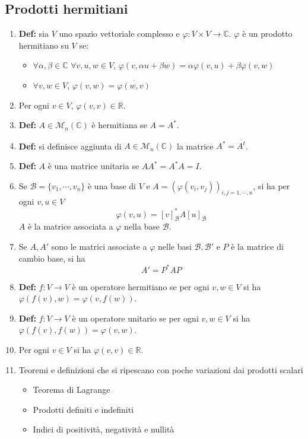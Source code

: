 \documentclass[a4paper,11pt]{article}
\newcommand{\con}[1]{\overline{#1}}				%
\newcommand{\tras}[1]{#1^t}						%
\newcommand{\agg}[1]{#1^*}							%
\begin{document}
\subsection{Prodotti hermitiani}
\begin{enumerate}[resume]
	\item\textbf{Def:} sia $V$ uno spazio vettoriale complesso e $\varphi\colon V\times V\to \mathbb{C}$. $\varphi$ è un prodotto hermitiano su $V$ se:
	\begin{itemize}
		\item $\forall\alpha,\beta\in\mathbb{C}$ $\forall v,u,w\in V$, $\varphi(v,\alpha u+\beta w)=\alpha\varphi(v,u)+\beta\varphi(v,w)$
		\item $\forall v,w\in V$, $\varphi(v,w)=\con{\varphi(w,v)}$
	\end{itemize}
	\item Per ogni $v\in V$, $\varphi(v,v)\in\mathbb{R}$.
	\item\textbf{Def:} $A\in\mathcal{M}_n(\mathbb{C})$ è hermitiana se $A=\agg{A}$.
	\item\textbf{Def:} si definisce aggiunta di $A\in\mathcal{M}_n(\mathbb{C})$ la matrice $\agg{A}=\con{\tras{A}}$.
	\item\textbf{Def:} $A$ è una matrice unitaria se $A\agg{A}=\agg{A}A=I$.
	\item Se $\mathcal{B}=\{v_1,\cdots,v_n\}$ è una base di $V$ e $A=(\varphi(v_i,v_j))_{i,j=1,\cdots,n}$, si ha per ogni $v,u\in V$
	\[\varphi(v,u)=\agg{[v]_\mathcal{B}}A[u]_\mathcal{B}\]
	$A$ è la matrice associata a $\varphi$ nella base $\mathcal{B}$.
	\item Se $A,A'$ sono le matrici associate a $\varphi$ nelle basi $\mathcal{B},\mathcal{B}'$ e $P$ è la matrice di cambio base, si ha
	\[A'=\agg{P}AP\]
	\item\textbf{Def:} $f\colon V\to V$ è un operatore hermitiano se per ogni $v,w\in V$ si ha $\varphi(f(v),w)=\varphi(v,f(w))$.
	\item\textbf{Def:} $f\colon V\to V$ è un operatore unitario se per ogni $v,w\in V$ si ha $\varphi(f(v),f(w))=\varphi(v,w)$.
	\item Per ogni $v\in V$ si ha $\varphi(v,v)\in\mathbb{R}$.	
	\item Teoremi e definizioni che si ripescano con poche variazioni dai prodotti scalari
	\begin{itemize}
		\item Teorema di Lagrange
		\item Prodotti definiti e indefiniti
		\item Indici di positività, negatività e nullità

\end{itemize}
\end{enumerate}
\end{document}
